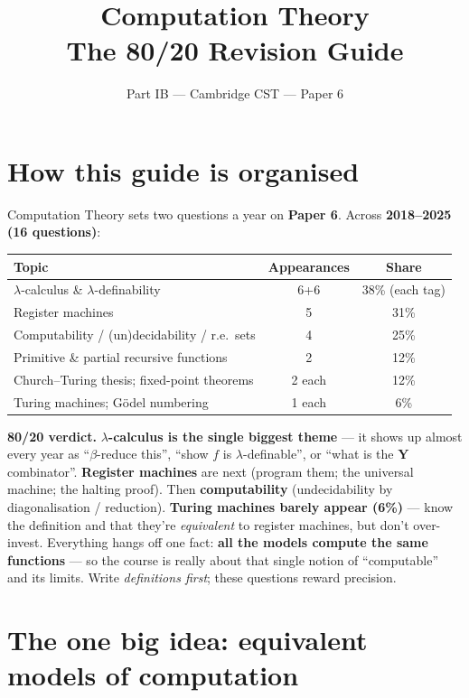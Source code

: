 \documentclass[11pt,a4paper]{article}
\title{\vspace{-1.5cm}\textbf{Computation Theory} \\[2pt] \large The 80/20 Revision Guide}
\author{\small Part IB --- Cambridge CST --- Paper 6}
\date{}
\begin{document}
\maketitle
\vspace{-0.8cm}

\section*{How this guide is organised}

Computation Theory sets two questions a year on \textbf{Paper 6}. Across \textbf{2018--2025 (16 questions)}:

\begin{center}
\begin{tabular}{lcc}
\hline
\textbf{Topic} & \textbf{Appearances} & \textbf{Share} \\
\hline
$\lambda$-calculus \& $\lambda$-definability & 6+6 & 38\% (each tag) \\
Register machines & 5 & 31\% \\
Computability / (un)decidability / r.e.\ sets & 4 & 25\% \\
Primitive \& partial recursive functions & 2 & 12\% \\
Church--Turing thesis; fixed-point theorems & 2 each & 12\% \\
Turing machines; G\"odel numbering & 1 each & 6\% \\
\hline
\end{tabular}
\end{center}

\textbf{80/20 verdict.} \textbf{$\lambda$-calculus is the single biggest theme} --- it shows up almost every year as ``$\beta$-reduce this'', ``show $f$ is $\lambda$-definable'', or ``what is the $\mathbf Y$ combinator''. \textbf{Register machines} are next (program them; the universal machine; the halting proof). Then \textbf{computability} (undecidability by diagonalisation / reduction). \textbf{Turing machines barely appear (6\%)} --- know the definition and that they're \emph{equivalent} to register machines, but don't over-invest. Everything hangs off one fact: \textbf{all the models compute the same functions} --- so the course is really about that single notion of ``computable'' and its limits. Write \emph{definitions first}; these questions reward precision.

\hrulefill

\section{The one big idea: equivalent models of computation}
\end{document}
